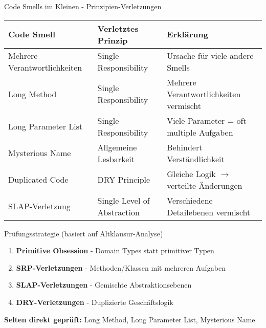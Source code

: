 \begin{frame}{Code Smells im Kleinen - Prinzipien-Verletzungen}
  \footnotesize
  \renewcommand{\arraystretch}{1.15}
  \begin{tabular}{|l|l|l|}
    \hline
    \textbf{Code Smell} & \textbf{Verletztes Prinzip} & \textbf{Erklärung} \\
    \hline
    \hline
    Mehrere Verantwortlichkeiten & Single Responsibility & Ursache für viele andere Smells \\
    \hline
    Long Method & Single Responsibility & Mehrere Verantwortlichkeiten vermischt \\
    \hline
    Long Parameter List & Single Responsibility & Viele Parameter = oft multiple Aufgaben \\
    \hline
    Mysterious Name & Allgemeine Lesbarkeit & Behindert Verständlichkeit \\
    \hline
    Duplicated Code & DRY Principle & Gleiche Logik $\rightarrow$ verteilte Änderungen \\
    \hline
    SLAP-Verletzung & Single Level of Abstraction & Verschiedene Detailebenen vermischt \\
    \hline
  \end{tabular}

  \begin{exampleblock}{\small Prüfungsstrategie (basiert auf Altklausur-Analyse)}
    \begin{enumerate}
      \item \textbf{Primitive Obsession} - Domain Types statt primitiver Typen
      \item \textbf{SRP-Verletzungen} - Methoden/Klassen mit mehreren Aufgaben
      \item \textbf{SLAP-Verletzungen} - Gemischte Abstraktionsebenen
      \item \textbf{DRY-Verletzungen} - Duplizierte Geschäftslogik
    \end{enumerate}
    \textbf{Selten direkt geprüft:} Long Method, Long Parameter List, Mysterious Name
  \end{exampleblock}
\end{frame}

